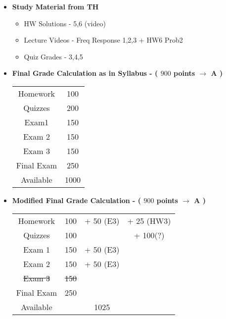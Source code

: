 \documentclass[11pt]{article}
\newcommand{\B}{\color{blue}}
\newcommand{\K}{\color{black}}
\newcommand{\G}{\color{mygreen}}
\newcommand{\PR}{\color{mypurple}}
\begin{document}
\begin{itemize}
\begin{enumerate}
\begin{itemize}
		\end{itemize}
	\end{enumerate}
%
\item  \textbf{\Large Study Material from TH}\\
\begin{itemize}

\item HW Solutions - 5,6 (video)
\item Lecture Videos - Freq Response 1,2,3 + HW6 Prob2

\item Quiz Grades - 3,4,5\\
%


\end{itemize}




\newpage


\item  \textbf{\Large Final Grade Calculation as in Syllabus - ( $900$ points $\rightarrow$ A )}\vspace{10mm}\\
\renewcommand{\arraystretch}{1.5}
\begin{tabular}{|c|c|}
Homework&100\\
Quizzes&200\\
Exam1&150\\ 
Exam 2&150\\
Exam 3&150\\
Final Exam&250\\
Available&1000\\
\end{tabular}

\vspace{10mm}
\item  \textbf{\Large Modified Final Grade Calculation - ( $900$ points $\rightarrow$ A )}\vspace{10mm}\\
\renewcommand{\arraystretch}{1.5}
\begin{tabular}{|c|c|c|c|}
Homework&100& + \B 50 (E3) \K& + \G 25 (HW3) \K \\
Quizzes&100& & + \PR 100(?)\\
Exam 1&150& + \B 50  (E3)&\\ 
Exam 2&150& + \B 50  (E3)&\\
\st{Exam 3}&\st{150}&&\\
Final Exam&250&&\\
Available&&1025\\
\end{tabular}


\end{itemize}
\end{document}
